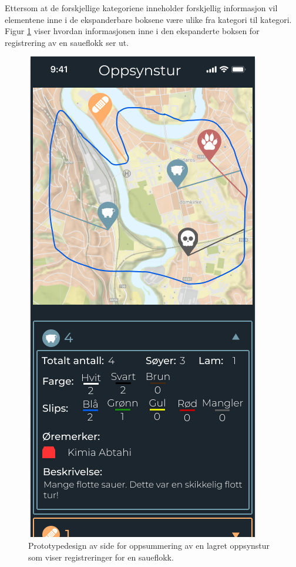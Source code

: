 \noindent
Ettersom at de forskjellige kategoriene inneholder forskjellig informasjon vil elementene inne i de ekspanderbare boksene være ulike fra kategori til kategori. Figur \ref{fig:figma-lagret-oppsynstur2} viser hvordan informasjonen inne i den ekspanderte boksen for registrering av en saueflokk ser ut.
\begin{figure}[H]
\centering
\captionsetup{width=.8\linewidth}
\includegraphics[scale=0.4]{Figurer/Figma/Frame 7 - Oppsynstur-oppsummering2.png}
\caption{Prototypedesign av side for oppsummering av en lagret oppsynstur som viser registreringer for en saueflokk.}
\label{fig:figma-lagret-oppsynstur2}
\end{figure}